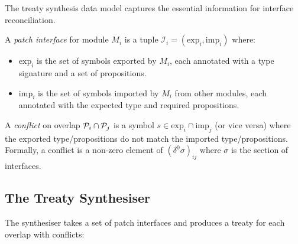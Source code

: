 \documentclass[11pt]{article}
\newcommand{\patch}{\mathcal{P}}
\newcommand{\iface}{\mathcal{I}}
\newcommand{\exports}{\mathrm{exp}}
\newcommand{\imports}{\mathrm{imp}}
\begin{document}
The treaty synthesis data model captures the essential information
for interface reconciliation.

\begin{definition}\label{def:patch-iface}
A \emph{patch interface} for module $M_i$ is a tuple
$\iface_i = (\exports_i, \imports_i)$ where:
\begin{itemize}[nosep]
\item $\exports_i$ is the set of symbols exported by $M_i$, each
  annotated with a type signature and a set of propositions.
\item $\imports_i$ is the set of symbols imported by $M_i$ from
  other modules, each annotated with the expected type and
  required propositions.
\end{itemize}
\end{definition}

\begin{definition}[Conflict]\label{def:conflict}
A \emph{conflict} on overlap $\overlap{\patch_i}{\patch_j}$ is a
symbol $s \in \exports_i \cap \imports_j$ (or vice versa) where the
exported type/propositions do not match the imported
type/propositions.  Formally, a conflict is a non-zero element of
$(\delta^0 \sigma)_{ij}$ where $\sigma$ is the section of
interfaces.
\end{definition}

\subsection{The Treaty Synthesiser}

The synthesiser takes a set of patch interfaces and produces a
treaty for each overlap with conflicts:
\end{document}

